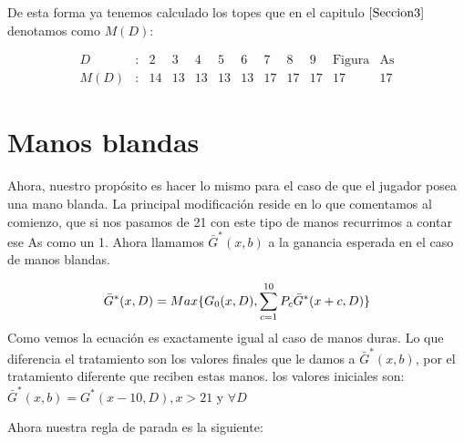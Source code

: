 \documentclass[12pt,a4paper,]{book}
\numberwithin{dummy}{section}
\theoremstyle{ocrenumbox}
\theoremstyle{blacknumex}
\theoremstyle{blacknumbox}
\theoremstyle{ocrenum}
\theoremstyle{ocrenum}
\begin{document}
De esta forma ya tenemos calculado los topes que en el capitulo
\(\ref{Seccion3}\) denotamos como \(M(D)\):

\[
\begin{array}{cccccccccccc}
D & : & 2 & 3 & 4 & 5 & 6 & 7 & 8 & 9 & \text{Figura} & \text{As} \\
\hline
M(D) & : & 14 & 13 & 13 & 13 & 13 & 17 & 17 & 17 & 17 & 17
\end{array}
\]

\hypertarget{Seccion42}{%
\section{Manos blandas}\label{Seccion42}}

Ahora, nuestro propósito es hacer lo mismo para el caso de que el
jugador posea una mano blanda. La principal modificación reside en lo
que comentamos al comienzo, que si nos pasamos de 21 con este tipo de
manos recurrimos a contar ese As como un 1. Ahora llamamos
\(\bar G^*(x,b)\) a la ganancia esperada en el caso de manos blandas.

\[
\bar G^*(x,D) = Max \\ \{G_0(x,D), \sum_{c=1}^{10}P_c \bar G^*(x+c,D) \}
\] Como vemos la ecuación es exactamente igual al caso de manos duras.
Lo que diferencia el tratamiento son los valores finales que le damos a
\(\bar G^*(x,b)\), por el tratamiento diferente que reciben estas manos.
los valores iniciales son: \(\bar G^*(x,b) = G^*(x-10,D),x>21\) y
\(\forall D\)

Ahora nuestra regla de parada es la siguiente:

\begingroup\fontsize{12}{14}\selectfont
\end{document}
